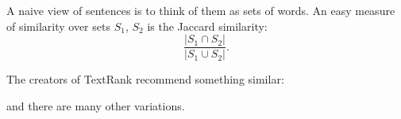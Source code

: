 A naive view of sentences is to think of them as sets of words.
An easy measure of similarity over sets $S_1$, $S_2$ is the Jaccard similarity:
\begin{equation*}
\frac{|S_1 \cap S_2|}{|S_1 \cup S_2|}.
\end{equation*}

The creators of TextRank recommend something similar:

and there are many other variations.

